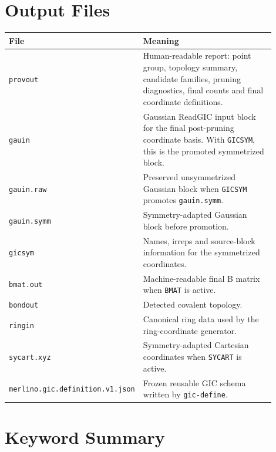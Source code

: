 \documentclass[11pt]{article}
\newcommand{\provout}{\texttt{provout}}
\newcommand{\gauin}{\texttt{gauin}}
\newcommand{\gicsym}{\texttt{gicsym}}
\begin{document}
\section{Output Files}

\begin{longtable}{@{}p{0.33\linewidth}p{0.57\linewidth}@{}}
\toprule
File & Meaning \\
\midrule
\endhead
\provout{} & Human-readable report: point group, topology summary, candidate
families, pruning diagnostics, final counts and final coordinate definitions. \\
\gauin{} & Gaussian ReadGIC input block for the final post-pruning coordinate
basis.  With \texttt{GICSYM}, this is the promoted symmetrized block. \\
\texttt{gauin.raw} & Preserved unsymmetrized Gaussian block when \texttt{GICSYM}
promotes \texttt{gauin.symm}. \\
\texttt{gauin.symm} & Symmetry-adapted Gaussian block before promotion. \\
\gicsym{} & Names, irreps and source-block information for the symmetrized
coordinates. \\
\texttt{bmat.out} & Machine-readable final B matrix when \texttt{BMAT} is
active. \\
\texttt{bondout} & Detected covalent topology. \\
\texttt{ringin} & Canonical ring data used by the ring-coordinate generator. \\
\texttt{sycart.xyz} & Symmetry-adapted Cartesian coordinates when
\texttt{SYCART} is active. \\
\texttt{merlino.gic.definition.}\newline\texttt{v1.json} & Frozen reusable GIC schema written by
\texttt{gic-define}. \\
\bottomrule
\end{longtable}

\section{Keyword Summary}
\end{document}
